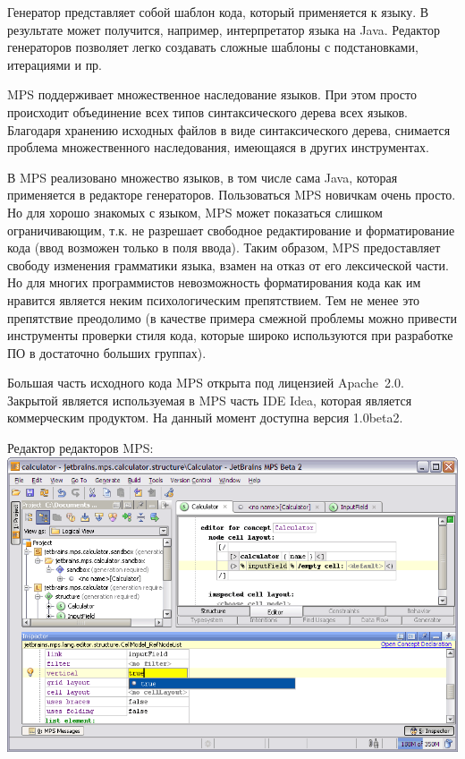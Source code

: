 \documentclass[a4paper,12pt,titlepage]{extarticle}
\begin{document}
Генератор представляет собой шаблон кода, который применяется к языку. В
результате может получится, например, интерпретатор языка на Java. Редактор
генераторов позволяет легко создавать сложные шаблоны с подстановками,
итерациями и пр.

MPS поддерживает множественное наследование языков. При этом просто происходит 
объединение всех типов синтаксического дерева всех языков. Благодаря хранению
исходных файлов в виде синтаксического дерева, снимается проблема
множественного наследования, имеющаяся в других инструментах.

В MPS реализовано множество языков, в том числе сама Java, которая применяется
в редакторе генераторов. Пользоваться MPS новичкам очень просто. Но для хорошо
знакомых с языком, MPS может показаться слишком ограничивающим, т.к. не
разрешает свободное редактирование и форматирование кода (ввод возможен только в
поля ввода). Таким образом, MPS предоставляет свободу изменения грамматики
языка, взамен на отказ от его лексической части. Но для многих программистов
невозможность форматирования кода как им нравится является неким психологическим
препятствием. Тем не менее это препятствие преодолимо (в качестве примера
смежной проблемы можно привести инструменты проверки стиля кода, которые широко
используются при разработке ПО в достаточно больших группах).

Большая часть исходного кода MPS открыта под лицензией Apache~2.0. Закрытой
является используемая в MPS часть IDE Idea, которая является коммерческим
продуктом.
На данный момент доступна версия 1.0beta2.

\begin{center}
Редактор редакторов MPS:\\
\includegraphics[scale=0.4]{img/mps.png}
\end{center}
\end{document}
